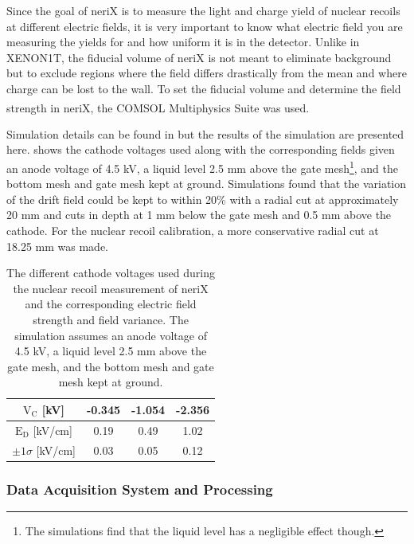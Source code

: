 
Since the goal of neriX is to measure the light and charge yield of nuclear recoils at different electric fields, it is very important to know what electric field you are measuring the yields for and how uniform it is in the detector.  Unlike in XENON1T, the fiducial volume of neriX is not meant to eliminate background but to exclude regions where the field differs drastically from the mean and where charge can be lost to the wall.  To set the fiducial volume and determine the field strength in neriX, the COMSOL Multiphysics\textsuperscript{\textregistered} Suite was used.  

Simulation details can be found in  but the results of the simulation are presented here.   shows the cathode voltages used along with the corresponding fields given an anode voltage of 4.5 kV, a liquid level 2.5 mm above the gate mesh\footnote{The simulations find that the liquid level has a negligible effect though.}, and the bottom mesh and gate mesh kept at ground.  Simulations found that the variation of the drift field could be kept to within 20\% with a radial cut at approximately 20 mm and cuts in depth at 1 mm below the gate mesh and 0.5 mm above the cathode.  For the nuclear recoil calibration, a more conservative radial cut at 18.25 mm was made.  

\begin{table}[t]
\centering
\def\arraystretch{1.3}
\begin{tabular}{c|ccc}
$\textrm{V}_{\textrm{C}}$ [kV] & -0.345 & -1.054 & -2.356 \\
\hline
$\textrm{E}_{\textrm{D}}$ [kV/cm] & 0.19 & 0.49 & 1.02 \\ 
$\pm 1\sigma$ [kV/cm] & 0.03 & 0.05 & 0.12 \\ 
\end{tabular}
\caption{The different cathode voltages used during the nuclear recoil measurement of neriX and the corresponding electric field strength and field variance.  The simulation assumes an anode voltage of 4.5 kV, a liquid level 2.5 mm above the gate mesh, and the bottom mesh and gate mesh kept at ground.}
\label{tab:nerix_electric_fields}
\end{table}



\subsubsection{Data Acquisition System and Processing}

